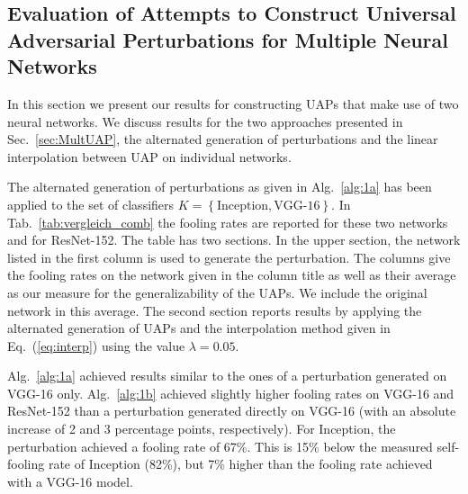 \documentclass[runningheads]{llncs}
\begin{document}
\subsection{Evaluation of Attempts to Construct Universal Adversarial Perturbations for Multiple Neural Networks}\label{sec:EvaluationCombined}
In this section we present our results for constructing UAPs that make use of two neural networks. We discuss results for the two approaches presented in Sec.~\ref{sec:MultUAP}, the alternated generation of perturbations and the linear interpolation between UAP on individual networks.

The alternated generation of perturbations as given in Alg.~\ref{alg:1a} has been applied to the set of classifiers \(K=\left\{\text{Inception},\text{VGG-16}\right\}\). In Tab.~\ref{tab:vergleich_comb} the fooling rates are reported for these two networks and for ResNet-152. The table has two sections. In the upper section, the network listed in the first column is used to generate the perturbation. The columns give the fooling rates on the network given in the column title as well as their average as our measure for the generalizability of the UAPs. We include the original network in this average. 
The second section reports results by applying the alternated generation of UAPs and the interpolation method given in Eq.~(\ref{eq:interp}) using the value $\lambda=0.05$. 

Alg.~\ref{alg:1a} achieved results similar to the ones of a perturbation generated on VGG-16 only. Alg.~\ref{alg:1b} achieved slightly higher fooling rates on VGG-16 and ResNet-152 than a perturbation generated directly on VGG-16 (with an absolute increase of 2 and 3 percentage points, respectively). For Inception, the perturbation achieved a fooling rate of 67\%. This is 15\% below the measured self-fooling rate of Inception (82\%), but 7\% higher than the fooling rate achieved with a VGG-16 model. 
\end{document}
